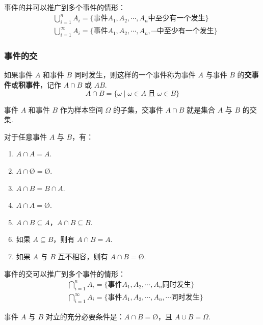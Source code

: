 事件的并可以推广到多个事件的情形：
$$
\begin{aligned}
    & \bigcup_{i=1}^n A_i = \{ \text{事件} A_1,A_2,\cdots,A_n \text{中至少有一个发生} \} \\
    & \bigcup_{i=1}^\infty A_i = \{ \text{事件} A_1,A_2,\cdots,A_n,\cdots \text{中至少有一个发生} \}
\end{aligned}
$$

\subsubsection{事件的交}

如果事件 $A$ 和事件 $B$ 同时发生，则这样的一个事件称为事件 $A$ 与事件 $B$ 的\textbf{交事件}或\textbf{积事件}，记作 $A \cap B$ 或 $AB$.
$$
A \cap B = \{ \omega \mid \omega \in A \;\text{且}\; \omega \in B \}
$$

事件 $A$ 和事件 $B$ 作为样本空间 $\varOmega$ 的子集，交事件 $A \cap B$ 就是集合 $A$ 与 $B$ 的交集.

\begin{property}
    \indent 对于任意事件 $A$ 与 $B$，有：
    \begin{enumerate}
        \item $A \cap A = A$.
        \item $A \cap \text{\O} = \text{\O}$.
        \item $A \cap B = B \cap A$.
        \item $A \cap \overline{A} = \text{\O}$.
        \item $A \cap B \subseteq A$，$A \cap B \subseteq B$.
        \item 如果 $A \subseteq B$，则有 $A \cap B = A$.
        \item 如果 $A$ 与 $B$ 互不相容，则有 $A \cap B = \text{\O}$.
    \end{enumerate}
\end{property}

事件的交可以推广到多个事件的情形：
$$
\begin{aligned}
    & \bigcap_{i=1}^n A_i = \{ \text{事件} A_1,A_2,\cdots,A_n \text{同时发生} \} \\
    & \bigcap_{i=1}^\infty A_i = \{ \text{事件} A_1,A_2,\cdots,A_n,\cdots \text{同时发生} \}
\end{aligned}
$$

\begin{conclusion}
    \indent 事件 $A$ 与 $B$ 对立的充分必要条件是：$A \cap B = \text{\O}$，且 $A \cup B = \varOmega$.
\end{conclusion}

